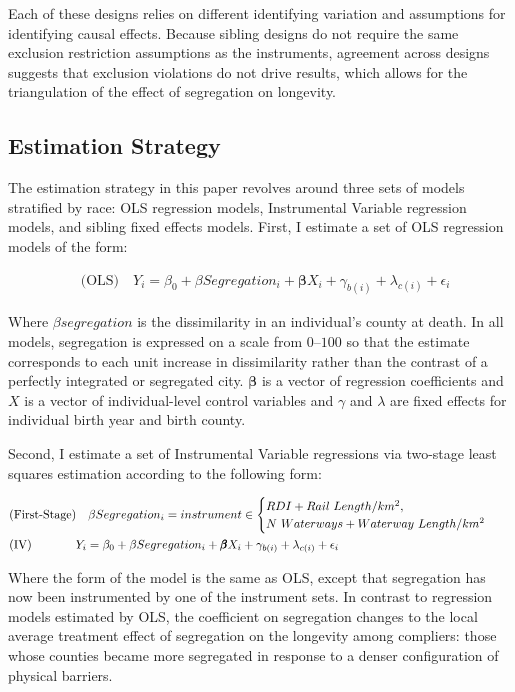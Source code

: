 \documentclass[11pt]{article}
\begin{document}
Each of these designs relies on different identifying variation and assumptions for identifying causal effects. Because sibling designs do not require the same exclusion restriction assumptions as the instruments, agreement across designs suggests that exclusion violations do not drive results, which allows for the triangulation of the effect of segregation on longevity.

\subsection{Estimation Strategy}

The estimation strategy in this paper revolves around three sets of models stratified by race: OLS regression models, Instrumental Variable regression models, and sibling fixed effects models. First, I estimate a set of OLS regression models of the form: 

\begin{align} 
&\text{(OLS)} \quad Y_i = \beta_0 + \beta Segregation_{i} +  \pmb{\beta} X_i + \gamma_{b(i)} + \lambda_{c(i)} + \epsilon_i 
\end{align}

Where $\beta segregation$ is the dissimilarity in an individual’s county at death. In all models, segregation is expressed on a scale from $0$--$100$ so that the estimate corresponds to each unit increase in dissimilarity rather than the contrast of a perfectly integrated or segregated city. $\pmb{\beta}$ is a vector of regression coefficients and $X$ is a vector of individual-level control variables and $\gamma$ and $\lambda$ are fixed effects for individual birth year and birth county.

Second, I estimate a set of Instrumental Variable regressions via two-stage least squares estimation according to the following form: 

\begin{align}
&\text{(First-Stage)} \quad \beta Segregation_{i} = instrument \in
\begin{cases}
\small RDI + Rail\ Length/km^2, \\
N\ Waterways + Waterway\ Length/km^2
\end{cases} & \\
&\text{(IV)} \qquad\quad\ \ Y_i = \beta_0 + \beta Segregation_{i} + \pmb{\beta} X_i + \gamma_{b(i)} + \lambda_{c(i)} + \epsilon_i & \nonumber
\end{align}

Where the form of the model is the same as OLS, except that segregation has now been instrumented by one of the instrument sets. In contrast to regression models estimated by OLS, the coefficient on segregation changes to the local average treatment effect of segregation on the longevity among compliers: those whose counties became more segregated in response to a denser configuration of physical barriers.
\end{document}
